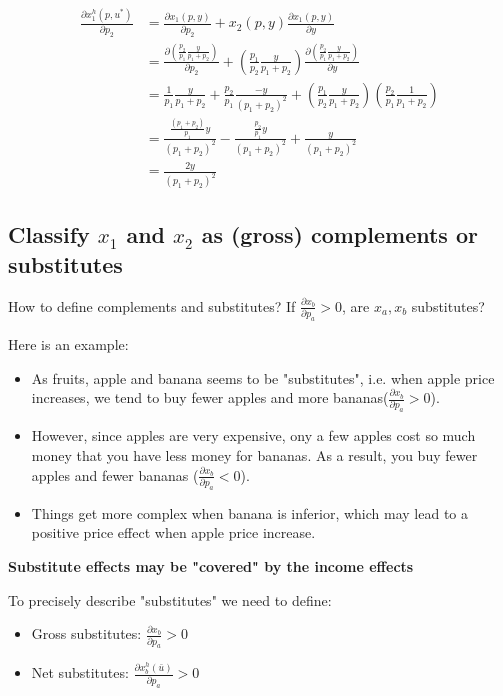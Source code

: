 \documentclass{article}
\begin{document}
\begin{align*}
\frac{\partial x_1^h(p,u^*)}{\partial p_2} &= \frac{\partial x_1(p,y)}{\partial p_2} + x_2(p,y)\frac{\partial x_1(p,y)}{\partial y} \\
&= \frac{\partial (\frac{p_2}{p_1}\frac{y}{p_1 + p_2})}{\partial p_2} + (\frac{p_1}{p_2}\frac{y}{p_1 + p_2})\frac{\partial (\frac{p_2}{p_1}\frac{y}{p_1 + p_2})}{\partial y} \\
&= \frac{1}{p_1}\frac{y}{p_1 + p_2} + \frac{p_2}{p_1}\frac{-y}{(p_1 + p_2)^2} + (\frac{p_1}{p_2}\frac{y}{p_1 + p_2})(\frac{p_2}{p_1}\frac{1}{p_1 + p_2}) \\
&=\frac{\frac{(p_1+p_2)}{p_1} y}{(p_1 + p_2)^2} - \frac{\frac{p_2}{p_1}y}{(p_1 + p_2)^2} +\frac{y}{(p_1 + p_2)^2} \\
&=\frac{2y}{(p_1 + p_2)^2} 
\end{align*}

\subsection{Classify $x_1$ and $x_2$ as (gross) complements or substitutes}

\begin{mdframed}[backgroundcolor=blue!20,linecolor=white]

How to define complements and substitutes? If $\frac{\partial x_b}{\partial p_a} > 0$, are $x_a,x_b$ substitutes?

Here is an example:

\begin{itemize}
\item As fruits, apple and banana seems to be "substitutes", i.e. when apple price increases, we tend to buy fewer apples and more bananas($\frac{\partial x_b}{\partial p_a} > 0$).

\item However, since apples are very expensive, ony a few apples cost so much money that you have less money for bananas. As a result, you buy fewer apples and fewer bananas ($\frac{\partial x_b}{\partial p_a} < 0$).

\item Things get more complex when banana is inferior, which may lead to a positive price effect when apple price increase. 
\end{itemize}

\begin{center}
\textbf{Substitute effects may be "covered" by the income effects}
\end{center}


To precisely describe "substitutes" we need to define:

\begin{itemize}
\item Gross substitutes: $\frac{\partial x_b}{\partial p_a} > 0$
\item Net substitutes: $\frac{\partial x^h_b(\bar{u})}{\partial p_a} > 0$
\end{itemize}

\end{mdframed}
\end{document}
